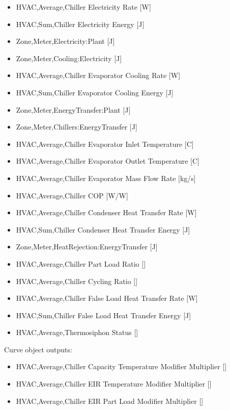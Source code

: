 \begin{itemize}
    \item
    HVAC,Average,Chiller Electricity Rate {[}W{]}
    \item
    HVAC,Sum,Chiller Electricity Energy {[}J{]}
    \item
    Zone,Meter,Electricity:Plant {[}J{]}
    \item
    Zone,Meter,Cooling:Electricity {[}J{]}
    \item
    HVAC,Average,Chiller Evaporator Cooling Rate {[}W{]}
    \item
    HVAC,Sum,Chiller Evaporator Cooling Energy {[}J{]}
    \item
    Zone,Meter,EnergyTransfer:Plant {[}J{]}
    \item
    Zone,Meter,Chillers:EnergyTransfer {[}J{]}
    \item
    HVAC,Average,Chiller Evaporator Inlet Temperature {[}C{]}
    \item
    HVAC,Average,Chiller Evaporator Outlet Temperature {[}C{]}
    \item
    HVAC,Average,Chiller Evaporator Mass Flow Rate {[}kg/s{]}
    \item
    HVAC,Average,Chiller COP {[}W/W{]}
    \item
    HVAC,Average,Chiller Condenser Heat Transfer Rate {[}W{]}
    \item
    HVAC,Sum,Chiller Condenser Heat Transfer Energy {[}J{]}
    \item
    Zone,Meter,HeatRejection:EnergyTransfer {[}J{]}
    \item
    HVAC,Average,Chiller Part Load Ratio {[]}
    \item
    HVAC,Average,Chiller Cycling Ratio {[]}
    \item
    HVAC,Average,Chiller False Load Heat Transfer Rate {[}W{]}
    \item
    HVAC,Sum,Chiller False Load Heat Transfer Energy {[}J{]}
    \item
    HVAC,Average,Thermosiphon Status {[]}
\end{itemize}

Curve object outputs:

\begin{itemize}
    \item
    HVAC,Average,Chiller Capacity Temperature Modifier Multiplier {[]}
    \item
    HVAC,Average,Chiller EIR Temperature Modifier Multiplier {[]}
    \item
    HVAC,Average,Chiller EIR Part Load Modifier Multiplier {[]}
\end{itemize}

